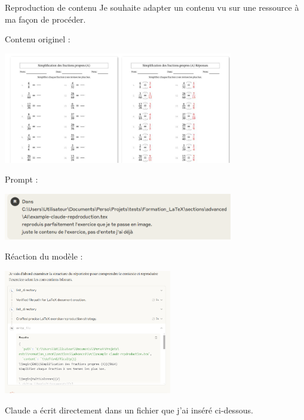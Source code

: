 \begin{bfbox}{Reproduction de contenu}
    Je souhaite adapter un contenu vu sur une ressource à ma façon de procéder. 

    \begin{MultiColonnes}{2}
        \tcbitem Contenu originel :
        
        \includegraphics[width=0.75\textwidth]{images/Claude-reproduction/1.png}

        \tcbitem Prompt : 

        \includegraphics[width=0.75\textwidth]{images/Claude-reproduction/2.png}

        \tcbitem Réaction du modèle : 

        \includegraphics[width=0.55\textwidth]{images/Claude-reproduction/3.png}

        \tcbitem Claude a écrit directement dans un fichier que j'ai inséré ci-dessous.
        
    \end{MultiColonnes}

\end{bfbox}


